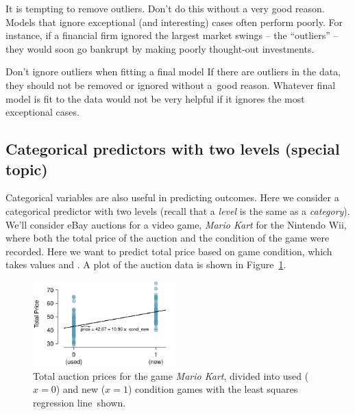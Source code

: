 It is tempting to remove outliers. Don't do this without a very good reason. Models that ignore exceptional (and interesting) cases often perform poorly. For instance, if a financial firm ignored the largest market swings -- the ``outliers'' --  they would soon go bankrupt by making poorly thought-out investments.

\begin{onebox}{Don't ignore outliers when fitting a final model}
{If there are outliers in the data, they should not be removed or ignored without a~good reason. Whatever final model is fit to the data would not be very helpful if it ignores the most exceptional cases.}
\end{onebox}


\D{\newpage}

\subsection{Categorical predictors with two levels (special topic)}
\label{categoricalPredictorsWithTwoLevels}
Categorical variables are also useful in predicting outcomes. Here we consider a categorical predictor with two levels (recall that a \emph{level} is the same as a \emph{category}). We'll consider eBay auctions for a video game, \emph{Mario Kart} for the Nintendo Wii, where both the total price of the auction and the condition of the game were recorded.
Here we want to predict total price based on game condition, which takes values  and . A plot of the auction data is shown in Figure~\ref{marioKartNewUsed}.

\begin{figure}[h]
\centering
\includegraphics[width=0.49\textwidth]{ch_regr_simple_linear/figures/marioKartNewUsed/marioKartNewUsed}
\caption{Total auction prices for the game \emph{Mario Kart}, divided into used ($x=0$) and new ($x=1$) condition games with the least squares regression line~shown.}
\label{marioKartNewUsed}
\end{figure}

